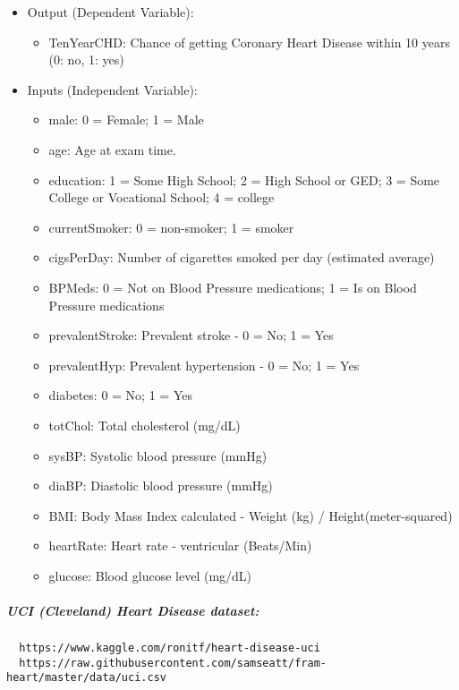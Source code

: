 \documentclass[]{article}
\providecommand{\tightlist}{%
  \setlength{\itemsep}{0pt}\setlength{\parskip}{0pt}}
\let\oldsubparagraph\subparagraph
\renewcommand{\subparagraph}[1]{\oldsubparagraph{#1}\mbox{}}
\begin{document}
\begin{itemize}
\tightlist
\item
  Output (Dependent Variable):

  \begin{itemize}
  \tightlist
  \item
    TenYearCHD: Chance of getting Coronary Heart Disease within 10 years
    (0: no, 1: yes)
  \end{itemize}
\item
  Inputs (Independent Variable):

  \begin{itemize}
  \tightlist
  \item
    male: 0 = Female; 1 = Male
  \item
    age: Age at exam time.
  \item
    education: 1 = Some High School; 2 = High School or GED; 3 = Some
    College or Vocational School; 4 = college
  \item
    currentSmoker: 0 = non-smoker; 1 = smoker
  \item
    cigsPerDay: Number of cigarettes smoked per day (estimated average)
  \item
    BPMeds: 0 = Not on Blood Pressure medications; 1 = Is on Blood
    Pressure medications
  \item
    prevalentStroke: Prevalent stroke - 0 = No; 1 = Yes
  \item
    prevalentHyp: Prevalent hypertension - 0 = No; 1 = Yes
  \item
    diabetes: 0 = No; 1 = Yes
  \item
    totChol: Total cholesterol (mg/dL)
  \item
    sysBP: Systolic blood pressure (mmHg)
  \item
    diaBP: Diastolic blood pressure (mmHg)
  \item
    BMI: Body Mass Index calculated - Weight (kg) /
    Height(meter-squared)
  \item
    heartRate: Heart rate - ventricular (Beats/Min)
  \item
    glucose: Blood glucose level (mg/dL)
  \end{itemize}
\end{itemize}

\subparagraph{UCI (Cleveland) Heart Disease
dataset:}\label{uci-cleveland-heart-disease-dataset}

\begin{verbatim}
  https://www.kaggle.com/ronitf/heart-disease-uci
  https://raw.githubusercontent.com/samseatt/fram-heart/master/data/uci.csv
\end{verbatim}
\end{document}

